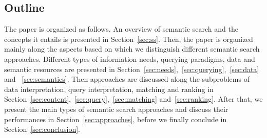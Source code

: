  


\subsection{Outline}
The paper is organized as follows. An overview of semantic search and the concepts it entails is presented in Section~\ref{sec:ss}. Then, the paper is organized mainly along the aspects based on which we distinguish different semantic search approaches. Different types of information needs, querying paradigms, data and semantic resources are presented in Section~\ref{sec:needs},~\ref{sec:querying},~\ref{sec:data} and ~\ref{sec:semantics}. Then approaches are discussed along the subproblems of data interpretation, query interpretation, matching and ranking in Section~\ref{sec:content},~\ref{sec:query},~\ref{sec:matching} and~\ref{sec:ranking}. After that, we present the main types of semantic search approaches and discuss their performances in Section~\ref{sec:approaches}, 
before we finally conclude in Section~\ref{sec:conclusion}.